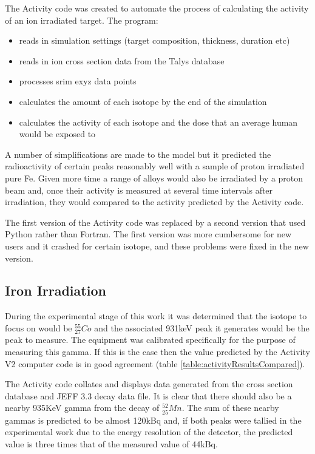 The Activity code was created to automate the process of calculating the activity of an ion irradiated target.  The program:

\begin{itemize}
\item reads in simulation settings (target composition, thickness, duration etc)
\item reads in ion cross section data from the Talys database
\item processes \acrshort{srim} exyz data points
\item calculates the amount of each isotope by the end of the simulation
\item calculates the activity of each isotope and the dose that an average human would be exposed to
\end{itemize}

A number of simplifications are made to the model but it predicted the radioactivity of certain peaks reasonably well with a sample of proton irradiated pure Fe.  Given more time a range of alloys would also be irradiated by a proton beam and, once their activity is measured at several time intervals after irradiation, they would compared to the activity predicted by the Activity code.

The first version of the Activity code was replaced by a second version that used Python rather than Fortran.  The first version was more cumbersome for new users and it crashed for certain isotope, and these problems were fixed in the new version.



\subsection{Iron Irradiation}

During the experimental stage of this work it was determined that the isotope to focus on would be ${}^{55}_{27} Co$ and the associated 931keV peak it generates would be the peak to measure.  The equipment was calibrated specifically for the purpose of measuring this gamma.  If this is the case then the value predicted by the Activity V2 computer code is in good agreement (table \ref{table:activityResultsCompared}). 

The Activity code collates and displays data generated from the cross section database and JEFF 3.3 decay data file.  It is clear that there should also be a nearby 935KeV gamma from the decay of ${}^{52}_{25}Mn$.  The sum of these nearby gammas is predicted to be almost 120kBq and, if both peaks were tallied in the experimental work due to the energy resolution of the detector, the predicted value is three times that of the measured value of 44kBq.

